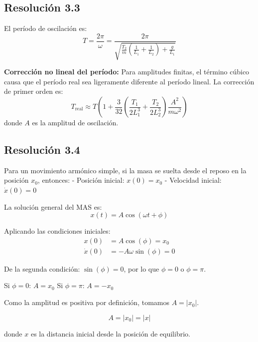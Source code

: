 \documentclass[
  11pt,
  letterpaper,
   addpoints,
  ]{exam}
\begin{document}
\begin{questions}
\begin{solution}
\subsection*{Resolución 3.3}

El período de oscilación es:
\begin{equation}
\boxed{T = \frac{2\pi}{\omega} = \frac{2\pi}{\sqrt{\frac{T_2}{m}\left(\frac{1}{L_1} + \frac{1}{L_2}\right) + \frac{g}{L_1}}}}
\end{equation}

\textbf{Corrección no lineal del período:} Para amplitudes finitas, el término cúbico causa que el período real sea ligeramente diferente al período lineal. La corrección de primer orden es:
\begin{equation}
T_{\text{real}} \approx T\left(1 + \frac{3}{32}\left(\frac{T_1}{2L_1^3} + \frac{T_2}{2L_2^3}\right)\frac{A^2}{m\omega^2}\right)
\end{equation}
donde $A$ es la amplitud de oscilación.

\subsection*{Resolución 3.4}

Para un movimiento armónico simple, si la masa se suelta desde el reposo en la posición $x_0$, entonces:
- Posición inicial: $x(0) = x_0$
- Velocidad inicial: $\dot{x}(0) = 0$

La solución general del MAS es:
\begin{equation}
x(t) = A\cos(\omega t + \phi)
\end{equation}

Aplicando las condiciones iniciales:
\begin{align}
x(0) &= A\cos(\phi) = x_0 \\
\dot{x}(0) &= -A\omega\sin(\phi) = 0
\end{align}

De la segunda condición: $\sin(\phi) = 0$, por lo que $\phi = 0$ o $\phi = \pi$.

Si $\phi = 0$: $A = x_0$
Si $\phi = \pi$: $A = -x_0$

Como la amplitud es positiva por definición, tomamos $A = |x_0|$.

\begin{equation}
\boxed{A = |x_0| = |x|}
\end{equation}

donde $x$ es la distancia inicial desde la posición de equilibrio.


\end{solution}
\end{questions}
\end{document}
